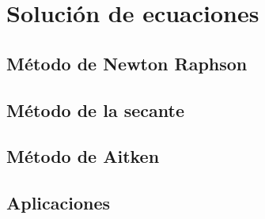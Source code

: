 \chapter{Solución de ecuaciones}

\section{Método de Newton Raphson}
\section{Método de la secante}
\section{Método de Aitken}
\section{Aplicaciones}


